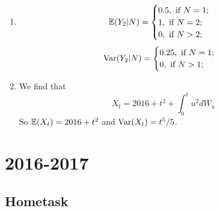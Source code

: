 \documentclass[12pt, a4paper]{article}
\begin{document}
\begin{enumerate}
\item
\[
\mathbb{E}(Y_2 |N) =\begin{cases}
0.5, \text{ if } N=1; \\
1, \text{ if } N=2; \\
0, \text{ if } N>2; \\
\end{cases}
\]
\[
\operatorname{Var}(Y_2 |N) =\begin{cases}
0.25, \text{ if } N=1; \\
0, \text{ if } N>1; \\
\end{cases}
\]
\item We find that
\[
X_t = 2016 + t^2 + \int_0^t u^2 dW_u
\]
So $\mathbb{E}(X_t) = 2016 + t^2$ and $\operatorname{Var}(X_t) = t^5/5$.
\end{enumerate}


\section{2016-2017}

\subsection{Hometask}
\end{document}
